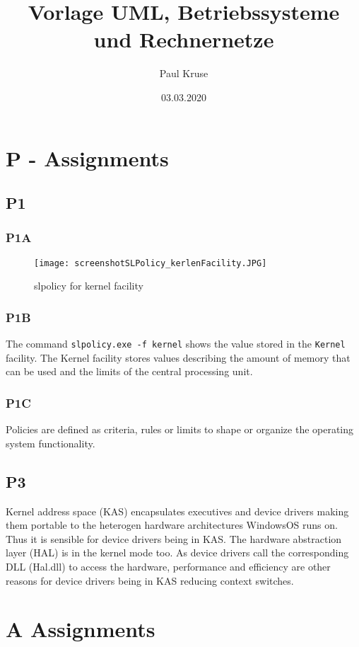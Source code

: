 \documentclass{Gharaei}
\title{Vorlage UML, Betriebssysteme und Rechnernetze}
\author{Paul Kruse}
\date{03.03.2020}
\begin{document}
\maketitle
\newpage
\thispagestyle{empty}
\tableofcontents
\setcounter{page}{1}
\newpage
\section{P - Assignments}
\thispagestyle{myheadings}
\subsection{P1}
\subsubsection{P1A}
\begin{figure}[H]
\centering
\texttt{[image: screenshotSLPolicy\_kerlenFacility.JPG]}
\caption{slpolicy for kernel facility}
\end{figure}
\subsubsection{P1B}
The command \texttt{slpolicy.exe -f kernel} shows the value stored in the \texttt{Kernel} facility. The Kernel facility stores values describing the amount of memory that can be used and the limits of the central processing unit. %
\subsubsection{P1C}
Policies are defined as criteria, rules or limits to shape or organize the operating system functionality.
\subsection{P3}
Kernel address space (KAS) encapsulates executives and device drivers making them portable to the heterogen hardware architectures WindowsOS runs on. Thus it is sensible for device drivers being in KAS. The hardware abstraction layer (HAL) is in the kernel mode too. As device drivers call the corresponding DLL (Hal.dll) to access the hardware, performance and efficiency are other reasons for device drivers being in KAS reducing context switches. 
\newpage
\section{A Assignments}
\end{document}
